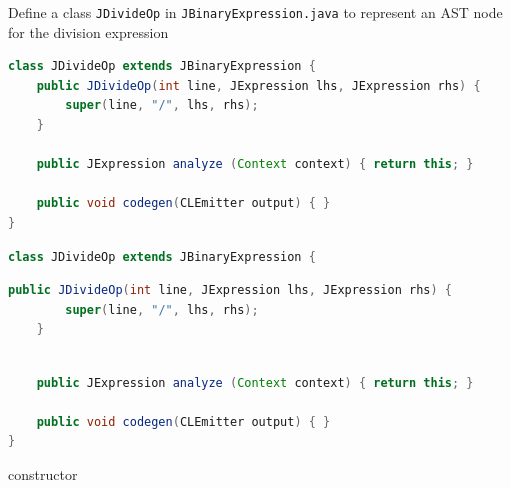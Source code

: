 \documentclass[8pt,a4paper,compress]{beamer}
\begin{document}
\begin{frame}[fragile]
Define a class \lstinline{JDivideOp} in \lstinline{JBinaryExpression.java} to represent an AST node for the division expression

\smallskip

\begin{overprint}
\begin{tcolorbox}[enhanced,drop shadow southwest,sharp corners,size=fbox,colback=white,fontlower=\small\ttfamily,collower=silver900]

\begin{lstlisting}[language=Java,style=focusin]
class JDivideOp extends JBinaryExpression {
    public JDivideOp(int line, JExpression lhs, JExpression rhs) {
        super(line, "/", lhs, rhs);
    }
 
    public JExpression analyze (Context context) { return this; }
    
    public void codegen(CLEmitter output) { }
}
\end{lstlisting}

\tcblower
\begin{minipage}[t][.2cm][t]{\textwidth}

\end{minipage}
\end{tcolorbox}

\begin{tcolorbox}[enhanced,drop shadow southwest,sharp corners,size=fbox,colback=white,fontlower=\small\ttfamily,collower=silver900]

\begin{lstlisting}[language=Java,style=focusin]
class JDivideOp extends JBinaryExpression {
\end{lstlisting}
\begin{lstlisting}[language=Java,style=focusin,backgroundcolor=\color{lime100}]
    public JDivideOp(int line, JExpression lhs, JExpression rhs) {
        super(line, "/", lhs, rhs);
    }
\end{lstlisting}
\begin{lstlisting}[language=Java,style=focusin]
 
    public JExpression analyze (Context context) { return this; }
    
    public void codegen(CLEmitter output) { }
}
\end{lstlisting}

\tcblower
\begin{minipage}[t][.2cm][t]{\textwidth}
constructor
\end{minipage}
\end{tcolorbox}


\end{overprint}
\end{frame}
\end{document}
